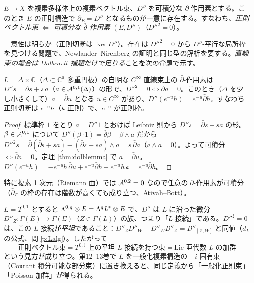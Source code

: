 \begin{thm}\tC\label{thm:KM}
$E\to X$ を複素多様体上の複素ベクトル束、$D''$ を可積分な $\bar\partial$-作用素とする。このとき $E$ の正則構造で $\bar\partial_E=D''$ となるものが一意に存在する。すなわち、\emph{正則ベクトル束 $\iff$ 可積分な $\bar\partial$-作用素 $(E,D'')$}（$D''^2=0$）。
\end{thm}
一意性は明らか（正則切断は $\ker D''$）。存在は $D''^2=0$ から $D''$-平行な局所枠を見つける問題で、Newlander--Nirenberg の証明と同じ型の解析を要する。\emph{直線束の場合は Dolbeault 補題だけで足りる}ことを次の命題で示す。

\begin{prop}[直線束の場合]\label{prop:linefrm}\tP
$L=\Delta\times\mathbb C$（$\Delta\subset\mathbb C^n$ 多重円板）の自明な $C^\infty$ 直線束上の $\bar\partial$-作用素は $D''s=\bar\partial s+s\,a$（$a\in\mathcal A^{0,1}(\Delta)$）の形で、$D''^2=0\iff\bar\partial a=0$。このとき（$\Delta$ を少し小さくして）$a=\bar\partial u$ となる $u\in C^\infty$ があり、$D''(e^{-u}h)=e^{-u}\bar\partial h$。すなわち正則切断は $e^{-u}h$（$h$ 正則）で、$e^{-u}$ が正則枠。
\end{prop}
\begin{proof}
標準枠 $1$ をとり $a=D''1$ とおけば Leibniz 則から $D''s=\bar\partial s+sa$ の形。$\beta\in\mathcal A^{0,1}$ について $D''(\beta\cdot1)=\bar\partial\beta-\beta\wedge a$ だから $D''^2s=\bar\partial(\bar\partial s+sa)-(\bar\partial s+sa)\wedge a=s\,\bar\partial a$（$a\wedge a=0$）。よって可積分 $\iff\bar\partial a=0$。定理 \ref{thm:dolblemma} で $a=\bar\partial u$。$D''(e^{-u}h)=-e^{-u}h\,\bar\partial u+e^{-u}\bar\partial h+e^{-u}h\,a=e^{-u}\bar\partial h$。\qedhere
\end{proof}
特に複素 1 次元（Riemann 面）では $\mathcal A^{0,2}=0$ なので任意の $\bar\partial$-作用素が可積分（$\bar\partial_E$ の枠の存在は階数が高くても成り立つ、Atiyah--Bott\tQ）。

\begin{rem}\label{rem:Lconn}
$L=T^{0,1}$ とすると $\Lambda^{0,q}\otimes E=\Lambda^qL^*\otimes E$ で、$D''$ は $L$ に沿った微分 $D''_Z:\Gamma(E)\to\Gamma(E)$（$Z\in\Gamma(L)$）の族、つまり「$L$-接続」である。$D''^2=0$ は、この $L$-接続が\emph{平坦}であること：$D''_ZD''_W-D''_WD''_Z=D''_{[Z,W]}$ と同値（$d_L$ の公式、問 \ref{p:Lalg}）。したがって
\[
\text{正則ベクトル束}=T^{0,1}\ \text{上の平坦 $L$-接続を持つ束}=\text{Lie 亜代数 $L$ の加群}
\]
という見方が成り立つ。第12--13巻で $L$ を一般化複素構造の $+i$ 固有束（Courant 積分可能な部分束）に置き換えると、同じ定義から「一般化正則束」「Poisson 加群」が得られる。
\end{rem}



